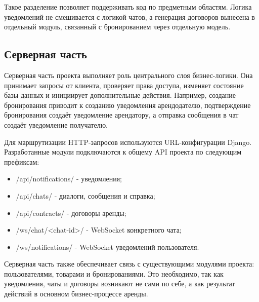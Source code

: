 Такое разделение позволяет поддерживать код по предметным областям. Логика уведомлений не смешивается с логикой чатов, а генерация договоров вынесена в отдельный модуль, связанный с бронированием через отдельную модель.

\subsection{Серверная часть}
Серверная часть проекта выполняет роль центрального слоя бизнес-логики. Она принимает запросы от клиента, проверяет права доступа, изменяет состояние базы данных и инициирует дополнительные действия. Например, создание бронирования приводит к созданию уведомления арендодателю, подтверждение бронирования создаёт уведомление арендатору, а отправка сообщения в чат создаёт уведомление получателю.

Для маршрутизации HTTP-запросов используются URL-конфигурации Django. Разработанные модули подключаются к общему API проекта по следующим префиксам:
\begin{itemize}
\item /api/notifications/ - уведомления;
\item /api/chats/ - диалоги, сообщения и справка;
\item /api/contracts/ - договоры аренды;
\item /ws/chat/<chat-id>/ - WebSocket конкретного чата;
\item /ws/notifications/ - WebSocket уведомлений пользователя.
\end{itemize}

Серверная часть также обеспечивает связь с существующими модулями проекта: пользователями, товарами и бронированиями. Это необходимо, так как уведомления, чаты и договоры возникают не сами по себе, а как результат действий в основном бизнес-процессе аренды.
